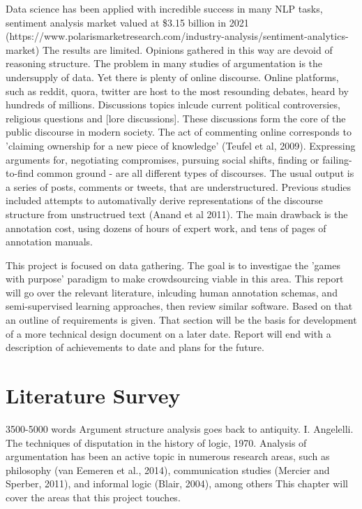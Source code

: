 \documentclass{article}
\begin{document}
Data science has been applied with incredible success in many NLP tasks, sentiment analysis market valued at \$3.15 billion in 2021 (https://www.polarismarketresearch.com/industry-analysis/sentiment-analytics-market)
The results are limited. Opinions gathered in this way are devoid of reasoning structure.
The problem in many studies of argumentation is the undersupply of data.
Yet there is plenty of online discourse.
Online platforms, such as reddit, quora, twitter are host to the most resounding debates, heard by hundreds of millions. 
Discussions topics inlcude current political controversies, religious questions and [lore discussions].
These discussions form the core of the public discourse in modern society. 
The act of commenting online corresponds to 'claiming ownership for a new piece of knowledge' (Teufel et al, 2009).
Expressing arguments for, negotiating compromises, pursuing social shifts, finding or failing-to-find common ground - are all different types of discourses. 
The usual output is a series of posts, comments or tweets, that are understructured. 
Previous studies included attempts to automativally derive representations of the discourse structure from unstructrued text (Anand et al 2011).
The main drawback is the annotation cost, using dozens of hours of expert work, and tens of pages of annotation manuals.

This project is focused on data gathering. The goal is to investigae the 'games with purpose' paradigm to make crowdsourcing viable in this area.
This report will go over the relevant literature, inlcuding human annotation schemas, and semi-supervised learning approaches, then review similar software. Based on that an outline of requirements is given. 
That section will be the basis for development of a more technical design document on a later date.
Report will end with a description of achievements to date and plans for the future.

\newpage

\section{Literature Survey} 3500-5000 words
Argument structure analysis goes back to antiquity. I. Angelelli. The techniques of disputation in the history of logic, 1970.
Analysis of argumentation has been an active topic in numerous research areas, such as philosophy (van Eemeren et al., 2014), communication studies (Mercier and Sperber, 2011), and informal logic (Blair, 2004), among others
This chapter will cover the areas that this project touches.
\end{document}
